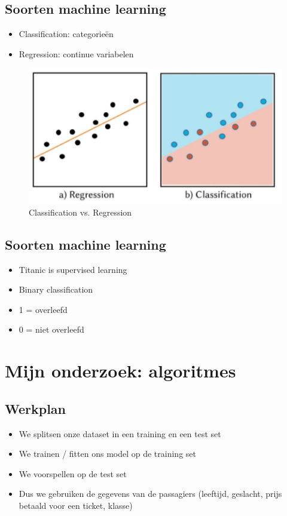 \documentclass[11pt]{article}
\begin{document}
\subsection*{Soorten machine learning}
\label{sec:org2d44d19}
\begin{itemize}
\item Classification: categorieën
\item Regression: continue variabelen
\end{itemize}
\begin{figure}[htbp]
\centering
\includegraphics[width=600]{./regvsclass.png}
\caption{Classification vs. Regression}
\end{figure}


\subsection*{Soorten machine learning}
\label{sec:orge91a569}
\begin{itemize}
\item Titanic is supervised learning
\item Binary classification
\item 1 = overleefd
\item 0 = niet overleefd
\end{itemize}

\section*{Mijn onderzoek: algoritmes}
\label{sec:org4b67bf1}
\subsection*{Werkplan}
\label{sec:org3653e17}

\begin{itemize}
\item We splitsen onze dataset in een training en een test set
\item We trainen / fitten ons model op de training set
\item We voorspellen op de test set
\item Dus we gebruiken de gegevens van de passagiers (leeftijd, geslacht, prijs betaald voor een ticket, klasse)
\end{itemize}
\end{document}
